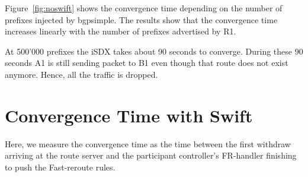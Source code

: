 
Figure~\ref{fig:noswift} shows the convergence time depending on the number of prefixes injected by bgpsimple. The results show that the convergence time increases linearly with the number of prefixes advertised by R1.

At 500'000 prefixes the iSDX takes about 90 seconds to converge. During these 90 seconds A1 is still sending packet to B1 even though that route does not exist anymore. Hence, all the traffic is dropped. 

\section{\label{chapter4:Convergence time with Swift}Convergence Time with Swift}

Here, we measure the convergence time as the time between the first withdraw arriving at the route server and the participant controller's FR-handler finishing to push the Fast-reroute rules.

